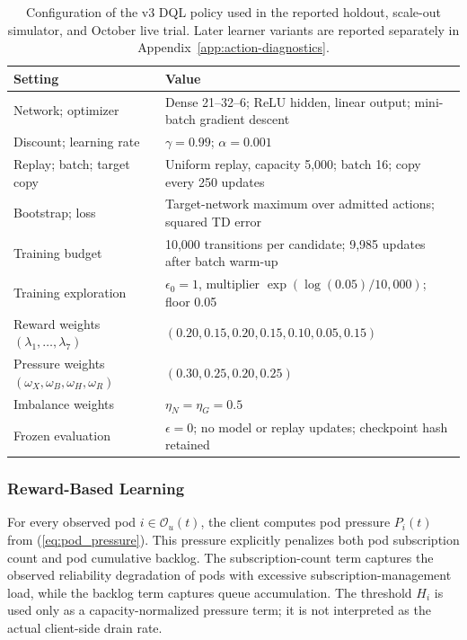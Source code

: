 \documentclass[manuscript,nonacm]{acmart}
\begin{document}
\begin{table}[!htbp]
\centering\small
\caption{Configuration of the v3 DQL policy used in the reported holdout,
scale-out simulator, and October live trial. Later learner variants are
reported separately in Appendix~\ref{app:action-diagnostics}.}
\label{tab:dql-configuration}
\begin{tabular}{p{}p{}}
\toprule
Setting & Value\\
\midrule
Network; optimizer & Dense 21--32--6; ReLU hidden, linear output; mini-batch gradient descent\\
Discount; learning rate & $\gamma=0.99$; $\alpha=0.001$\\
Replay; batch; target copy & Uniform replay, capacity 5,000; batch 16; copy every 250 updates\\
Bootstrap; loss & Target-network maximum over admitted actions; squared TD error\\
Training budget & 10,000 transitions per candidate; 9,985 updates after batch warm-up\\
Training exploration & $\epsilon_0=1$, multiplier $\exp(\log(0.05)/10{,}000)$; floor 0.05\\
Reward weights $(\lambda_1,\ldots,\lambda_7)$ & $(0.20,0.15,0.20,0.15,0.10,0.05,0.15)$\\
Pressure weights $(\omega_X,\omega_B,\omega_H,\omega_R)$ & $(0.30,0.25,0.20,0.25)$\\
Imbalance weights & $\eta_N=\eta_G=0.5$\\
Frozen evaluation & $\epsilon=0$; no model or replay updates; checkpoint hash retained\\
\bottomrule
\end{tabular}
\end{table}

\subsubsection{Reward-Based Learning}

For every observed pod $i\in\mathcal{O}_u(t)$, the client computes pod pressure
$P_i(t)$ from (\ref{eq:pod_pressure}). This pressure explicitly penalizes both
pod subscription count and pod cumulative backlog. The subscription-count term
captures the observed reliability degradation of pods with excessive
subscription-management load, while the backlog term captures queue
accumulation. The threshold $H_i$ is used only as a capacity-normalized pressure
term; it is not interpreted as the actual client-side drain rate.
\end{document}
